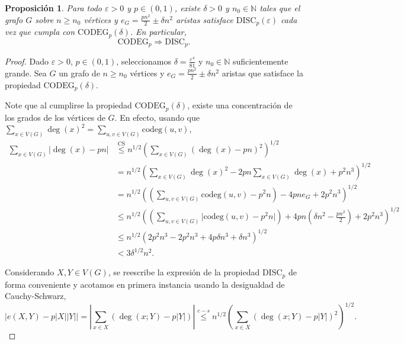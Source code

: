 \documentclass{article}[14pts]
\newtheorem{prop}{Proposición}
\newcommand{\disc}{\mathrm{DISC}}
\newcommand{\codeg}{\mathrm{CODEG}}
\newcommand{\cod}{\mathrm{codeg}}
\let\varepsilon=\varepsilon
\begin{document}
\begin{prop} \label{codeg => disc}
    Para todo $\varepsilon > 0$ y $p\in (0,1)$, existe $\delta > 0$ y $n_0\in \mathbb{N}$ tales que el grafo $G$ sobre $n\geq n_0$ vértices y $e_G = \frac{pn^{2}}{2} \pm \delta n^{2}$ aristas satisface $\disc_p (\varepsilon)$ cada vez que cumpla con $\codeg_p(\delta)$. En particular,
    \[
        \codeg_p \Rightarrow \disc_p.
    \]
\end{prop}

\begin{proof}
    Dado $\varepsilon > 0$, $p\in (0,1)$, seleccionamos $\delta = \frac{\varepsilon^{4}}{81}$ y $n_0\in\mathbb{N}$ suficientemente grande. Sea $G$ un grafo de $n\geq n_0$ vértices y $e_G = \frac{pn^{2}}{2} \pm \delta n^{2}$ aristas que satisface la propiedad $\codeg_p (\delta)$.
    
    Note que al cumplirse la propiedad $\codeg_p(\delta)$, existe una concentración de los grados de los vértices de $G$. En efecto, usando que $\sum_{x\in V(G)} \deg(x)^{2} = \sum_{u,v\in V(G)} \cod(u,v)$,
    \begin{align*}
        \displaystyle\sum_{x\in V(G)} \Big|\deg(x) - pn\Big| &\overset{\mathrm{CS}}{\leq} n^{1/2}\left( \displaystyle\sum_{x\in V(G)} (\deg(x) - pn)^{2}\right)^{1/2}\\
        &= n^{1/2}\left( \displaystyle\sum_{x\in V(G)} \deg(x)^{2} -2pn\displaystyle\sum_{x\in V(G)} \deg(x) + p^{2}n^{3}\right)^{1/2}\\
        &= n^{1/2}\left( \left(\displaystyle\sum_{u,v\in V(G)} \cod(u,v) - p^{2}n\right) -4pn e_G + 2p^{2}n^{3} \right)^{1/2}\\
        &\leq n^{1/2}\left( \left(\displaystyle\sum_{u,v\in V(G)} \Big|\cod(u,v) - p^{2}n\Big|\right) + 4pn\left( \delta n^{2} - \frac{pn^{2}}{2}\right) + 2p^{2}n^{3}\right)^{1/2}\\
        &\leq n^{1/2}\left( 2p^{2}n^{3} - 2p^{2}n^{3} + 4p\delta n^{3} + \delta n^{3}\right)^{1/2}\\
        &< 3\delta^{1/2}n^{2}.
    \end{align*}

    Considerando $X,Y\in V(G)$, se reescribe la expresión de la propiedad $\disc_p$ de forma conveniente y acotamos en primera instancia usando la desigualdad de Cauchy-Schwarz,
    \begin{equation} \label{ec_prop_6}
        \Big|e(X,Y) - p|X||Y|\Big| = \left| \displaystyle\sum_{x\in X} (\deg(x;Y) - p|Y|)\right| \overset{c-s}{\leq} n^{1/2}\left( \displaystyle\sum_{x\in X} (\deg(x;Y) - p|Y|)^{2}\right)^{1/2}.
    \end{equation}


\end{proof}
\end{document}
